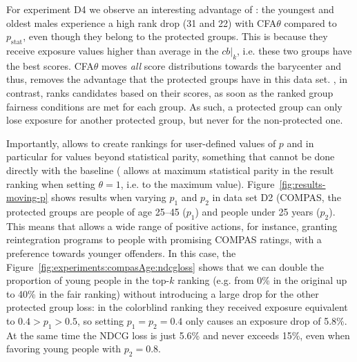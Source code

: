 For experiment D4 we observe an interesting advantage of \algoFAIR: the youngest and oldest males experience a high rank drop (31 and 22) with CFA$\theta$ compared to \algoFAIR $p_{\text{stat}}$, even though they belong to the protected groups.
%
This is because they receive exposure values higher than average in the $cb|_k$, i.e. these two groups have the best scores.
%
CFA$\theta$ moves \emph{all} score distributions towards the barycenter and thus, removes the advantage that the protected groups have in this data set.
%
\algoFAIR, in contrast, ranks candidates based on their scores, as soon as the ranked group fairness conditions are met for each group.
%
As such, a protected group can only lose exposure for another protected group, but never for the non-protected one.

Importantly, \algoFAIR allows to create rankings for user-defined values of $p$ and in particular for values beyond statistical parity, something that cannot be done directly with the baseline (\citet{zehlike2020matching} allows at maximum statistical parity in the result ranking when setting $\theta=1$, i.e. to the maximum value).
%
Figure~\ref{fig:results-moving-p} shows results when varying $p_1$ and $p_2$ in data set D2 (COMPAS, the protected groups are people of age 25--45 ($p_1$) and people under 25 years ($p_2$).
%
This means that \algoFAIR allows a wide range of positive actions, for instance, granting reintegration programs to people with promising COMPAS ratings, with a preference towards younger offenders.
%
In this case, the Figure~\ref{fig:experiments:compasAge:ndcgloss} shows that we can double the proportion of young people in the top-$k$ ranking (e.g. from 0\% in the original up to 40\% in the fair ranking) without introducing a large drop for the other protected group loss: in the colorblind ranking they received exposure equivalent to $0.4 > p_1 > 0.5$, so setting $p_1 = p_2 = 0.4$ only causes an exposure drop of 5.8\%.
%
At the same time the NDCG loss is just 5.6\% and never exceeds 15\%, even when favoring young people with $p_2=0.8$.
